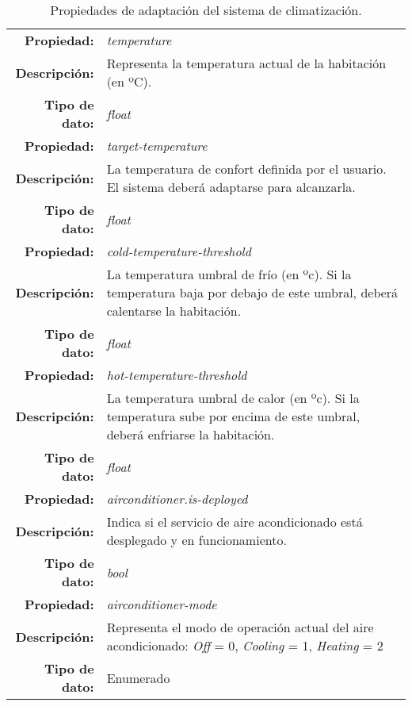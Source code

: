 \begin{table}[htb]
  \centering

  \begin{tabular}{|r p{11.5cm}|}
    \hline
    \textbf{Propiedad:} & \emph{temperature}  \\
    \textbf{Descripción:} & Representa la temperatura actual de la habitación (en ºC).  \\
    \textbf{Tipo de dato:} & \emph{float} \\
    \hline
    \textbf{Propiedad:} & \emph{target-temperature}  \\
    \textbf{Descripción:} & La temperatura de confort definida por el usuario. El sistema deberá adaptarse para alcanzarla.  \\
    \textbf{Tipo de dato:} & \emph{float} \\
    \hline
    \textbf{Propiedad:} & \emph{cold-temperature-threshold}  \\
    \textbf{Descripción:} & La temperatura umbral de frío (en ºc). Si la temperatura baja por debajo de este umbral, deberá calentarse la habitación. \\
    \textbf{Tipo de dato:} & \emph{float} \\
    \hline
    \textbf{Propiedad:} & \emph{hot-temperature-threshold}  \\
    \textbf{Descripción:} & La temperatura umbral de calor (en ºc). Si la temperatura sube por encima de este umbral, deberá enfriarse la habitación. \\
    \textbf{Tipo de dato:} & \emph{float} \\
    \hline
    \textbf{Propiedad:} & \emph{airconditioner.is-deployed}  \\
    \textbf{Descripción:} & Indica si el servicio de aire acondicionado está desplegado y en funcionamiento.  \\
    \textbf{Tipo de dato:} & \emph{bool} \\
    \hline
    \textbf{Propiedad:} & \emph{airconditioner-mode}  \\
    \textbf{Descripción:} & Representa el modo de operación actual del aire acondicionado: \emph{Off} = 0, \emph{Cooling} = 1, \emph{Heating} = 2  \\
    \textbf{Tipo de dato:} & Enumerado \\
    \hline
  \end{tabular}

  \caption{Propiedades de adaptación del sistema de climatización.}
  \label{tab:adaption-properties-climatisation}
\end{table}

